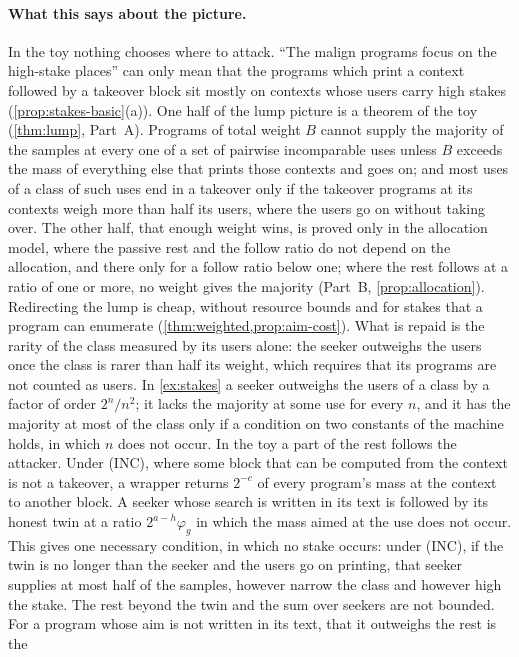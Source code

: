 \paragraph{What this says about the picture.} In the toy nothing chooses where to attack. ``The malign
programs focus on the high-stake places'' can only mean that the programs which print a context followed by a
takeover block sit mostly on contexts whose users carry high stakes (\cref{prop:stakes-basic}(a)). One half of
the lump picture is a theorem of the toy (\cref{thm:lump}, Part~A). Programs of total weight $B$ cannot supply
the majority of the samples at every one of a set of pairwise incomparable uses unless $B$ exceeds the mass of
everything else that prints those contexts and goes on; and most uses of a class of such uses end in a
takeover only if the takeover programs at its contexts weigh more than half its users, where the users go on
without taking over. The other half, that enough weight wins, is proved only in the allocation model, where
the passive rest and the follow ratio do not depend on the allocation, and there only for a follow ratio
below one; where the rest follows at a ratio of one or more, no weight gives the majority (Part~B,
\cref{prop:allocation}).
Redirecting the lump is cheap, without resource bounds and for stakes that a program can enumerate
(\cref{thm:weighted,prop:aim-cost}). What is repaid is the rarity of the class measured by its users alone:
the seeker outweighs the users once the class is rarer than half its weight, which requires that its programs
are not counted as users. In \cref{ex:stakes} a seeker outweighs the users of a class by a factor of order
$2^n/n^2$; it lacks the majority at some use for every $n$, and it has the majority at most of the class only
if a condition on two constants of the machine holds, in which $n$ does not occur. In the toy a part of the
rest follows the attacker. Under (INC), where some block that can be computed from the context is not a
takeover, a wrapper returns $2^{-c}$ of every program's mass at the context to another block. A seeker whose
search is written in its text is followed by its honest twin at a ratio $2^{a-h}\varphi_g$ in which the mass
aimed at the use does not occur. This gives one necessary condition, in which no stake occurs: under (INC), if
the twin is no longer than the seeker and the users go on printing, that seeker supplies at most half of the
samples, however narrow the class and however high the stake. The rest beyond the twin and the sum over
seekers are not bounded. For a program whose aim is not written in its text, that it outweighs the rest is the
